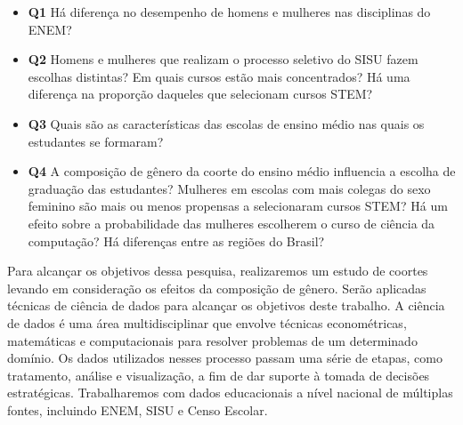 \begin{itemize}
  \item \textbf{Q1} Há diferença no desempenho de homens e mulheres nas disciplinas do ENEM?
  \item \textbf{Q2} Homens e mulheres que realizam o processo seletivo do SISU fazem escolhas distintas? Em quais cursos estão mais concentrados? Há uma diferença na proporção daqueles que selecionam cursos STEM?
  \item \textbf{Q3} Quais são as características das escolas de ensino médio nas quais os estudantes se formaram?
  \item \textbf{Q4} A composição de gênero da coorte do ensino médio influencia a escolha de graduação das estudantes? Mulheres em escolas com mais colegas do sexo feminino são mais ou menos propensas a selecionaram cursos STEM? Há um efeito sobre a probabilidade das mulheres escolherem o curso de ciência da computação? Há diferenças entre as regiões do Brasil?
\end{itemize}

Para alcançar os objetivos dessa pesquisa, realizaremos um estudo de coortes levando em consideração os efeitos da composição de gênero. Serão aplicadas técnicas de ciência de dados para alcançar os objetivos deste trabalho. A ciência de dados é uma área multidisciplinar que envolve técnicas econométricas, matemáticas e computacionais para resolver problemas de um determinado domínio. Os dados utilizados nesses processo passam uma série de etapas, como tratamento, análise e visualização, a fim de dar suporte à tomada de decisões estratégicas. Trabalharemos com dados educacionais a nível nacional de múltiplas fontes, incluindo ENEM, SISU e Censo Escolar.


